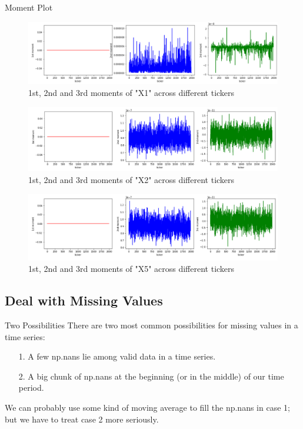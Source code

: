 \documentclass{beamer}
\begin{document}
\begin{frame}{Moment Plot}
\begin{figure}[ht]
\centering
\includegraphics[scale=0.22]{moments_x1.PNG}
\caption{1st, 2nd and 3rd moments of "X1" across different tickers}
\label{fig:label}
\end{figure}

\begin{figure}[ht]
\centering
\includegraphics[scale=0.3]{moments_x2.PNG}
\caption{1st, 2nd and 3rd moments of "X2" across different tickers}
\label{fig:label}
\end{figure}

\begin{figure}[ht]
\centering
\includegraphics[scale=0.3]{moments_x5.PNG}
\caption{1st, 2nd and 3rd moments of "X5" across different tickers}
\label{fig:label}
\end{figure}
\end{frame}

\subsection{Deal with Missing Values}
\begin{frame}{Two Possibilities}
There are two most common possibilities for missing values in a time series:
\begin{itemize}
    \item[1.] A few np.nans lie among valid data in a time series.
    \item[2.] A big chunk of np.nans at the beginning (or in the middle) of our time period.
\end{itemize}

\noindent We can probably use some kind of moving average to fill the np.nans in case 1; but we have to treat case 2 more seriously.\\
\end{frame}
\end{document}
